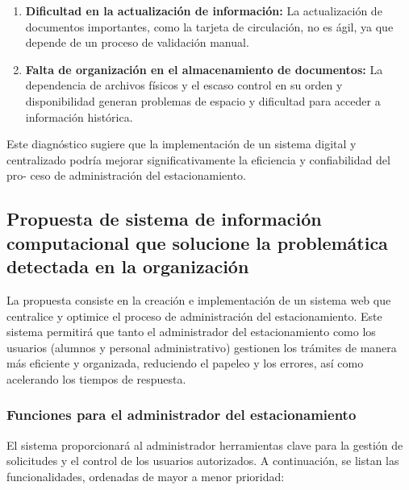 {\begin{enumerate}
\item {\textbf{Dificultad en la actualización de información: }La actualización de
documentos importantes, como la tarjeta de circulación, no es ágil, ya que
depende de un proceso de validación manual.}
\item{\textbf{Falta de organización en el almacenamiento de documentos:} La
	dependencia de archivos físicos y el escaso control en su orden y disponibilidad
	 generan problemas de espacio y dificultad para acceder a información
	histórica.}
\end{enumerate}
Este diagnóstico sugiere que la implementación de un sistema digital y centralizado 
podría mejorar significativamente la eficiencia y confiabilidad del pro-
ceso de administración del estacionamiento.
\subsection{Propuesta de sistema de información computacional que solucione la problemática detectada en la organización}

La propuesta consiste en la creación e implementación de un sistema web que centralice y optimice el proceso de administración del estacionamiento. Este sistema permitirá que tanto el administrador del estacionamiento como los usuarios (alumnos y personal administrativo) gestionen los trámites de manera más eficiente y organizada, reduciendo el papeleo y los errores, así como acelerando los tiempos de respuesta.

\subsubsection{Funciones para el administrador del estacionamiento}

El sistema proporcionará al administrador herramientas clave para la gestión de solicitudes y el control de los usuarios autorizados. A continuación, se listan las funcionalidades, ordenadas de mayor a menor prioridad:

}
